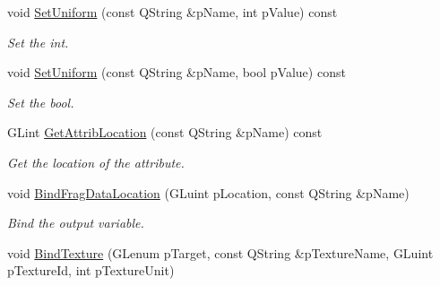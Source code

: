 \begin{DoxyCompactItemize}
void \hyperlink{class_g_l_s_l_program_a3f5fdc3ce068a40d554fab1e2740882b}{Set\+Uniform} (const Q\+String \&p\+Name, int p\+Value) const 
\begin{DoxyCompactList}\small\item\em Set the int. \end{DoxyCompactList}\item 
void \hyperlink{class_g_l_s_l_program_a95ba7cabf2acfaf2b95d7c45eeab4bae}{Set\+Uniform} (const Q\+String \&p\+Name, bool p\+Value) const 
\begin{DoxyCompactList}\small\item\em Set the bool. \end{DoxyCompactList}\item 
G\+Lint \hyperlink{class_g_l_s_l_program_aea42ad0d8b139ef07a12d4860c5ed64c}{Get\+Attrib\+Location} (const Q\+String \&p\+Name) const 
\begin{DoxyCompactList}\small\item\em Get the location of the attribute. \end{DoxyCompactList}\item 
void \hyperlink{class_g_l_s_l_program_a69a40d9830cea96099abbf482a7bb281}{Bind\+Frag\+Data\+Location} (G\+Luint p\+Location, const Q\+String \&p\+Name)
\begin{DoxyCompactList}\small\item\em Bind the output variable. \end{DoxyCompactList}\item 
void \hyperlink{class_g_l_s_l_program_af48e36761fd233482be6584ab8e8a04e}{Bind\+Texture} (G\+Lenum p\+Target, const Q\+String \&p\+Texture\+Name, G\+Luint p\+Texture\+Id, int p\+Texture\+Unit)
\end{DoxyCompactItemize}
